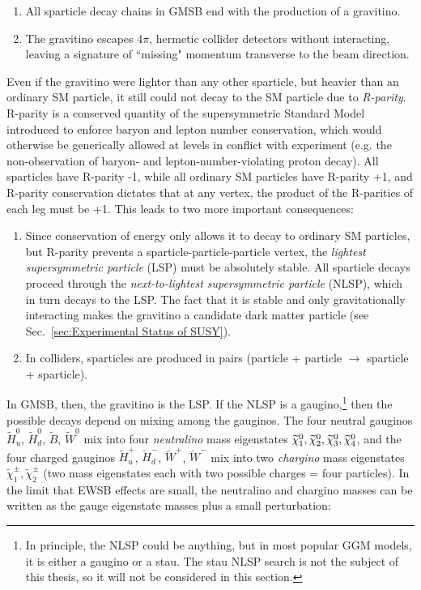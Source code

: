 \documentclass[dissertation.tex]{subfiles}
\begin{document}
\begin{enumerate}
  \item All sparticle decay chains in GMSB end with the production of a gravitino.
  \item The gravitino escapes 4$\pi$, hermetic collider detectors without interacting, leaving a signature of ``missing" momentum transverse to the beam direction.
\end{enumerate}

Even if the gravitino were lighter than any other sparticle, but heavier than an ordinary SM particle, it still could not decay to the SM particle due to \textit{R-parity}.  R-parity is a conserved quantity of the supersymmetric Standard Model introduced to enforce baryon and lepton number conservation, which would otherwise be generically allowed at levels in conflict with experiment (e.g. the non-observation of baryon- and lepton-number-violating proton decay).  All sparticles have R-parity -1, while all ordinary SM particles have R-parity +1, and R-parity conservation dictates that at any vertex, the product of the R-parities of each leg must be +1.  This leads to two more important consequences:

\begin{enumerate}
  \item Since conservation of energy only allows it to decay to ordinary SM particles, but R-parity prevents a sparticle-particle-particle vertex, the \textit{lightest supersymmetric particle} (LSP) must be absolutely stable.  All sparticle decays proceed through the \textit{next-to-lightest supersymmetric particle} (NLSP), which in turn decays to the LSP.  The fact that it is stable and only gravitationally interacting makes the gravitino a candidate dark matter particle (see Sec.~\ref{sec:Experimental Status of SUSY}).
  \item In colliders, sparticles are produced in pairs (particle + particle $\rightarrow$ sparticle + sparticle).
\end{enumerate}

In GMSB, then, the gravitino is the LSP.  If the NLSP is a gaugino,\footnote{In principle, the NLSP could be anything, but in most popular GGM models, it is either a gaugino or a stau.  The stau NLSP search is not the subject of this thesis, so it will not be considered in this section.} then the possible decays depend on mixing among the gauginos.  The four neutral gauginos $\widetilde{H}_{u}^{0}$, $\widetilde{H}_{d}^{0}$, $\widetilde{B}$, $\widetilde{W}^{0}$ mix into four \textit{neutralino} mass eigenstates $\widetilde{\chi}_{1}^{0}, \widetilde{\chi}_{2}^{0}, \widetilde{\chi}_{3}^{0}, \widetilde{\chi}_{4}^{0}$, and the four charged gauginos $\widetilde{H}_{u}^{+}$, $\widetilde{H}_{d}^{-}$, $\widetilde{W}^{+}$, $\widetilde{W}^{-}$ mix into two \textit{chargino} mass eigenstates $\widetilde{\chi}_{1}^{\pm}, \widetilde{\chi}_{2}^{\pm}$ (two mass eigenstates each with two possible charges = four particles).  In the limit that EWSB effects are small, the neutralino and chargino masses can be written as the gauge eigenstate masses plus a small perturbation:
\end{document}
